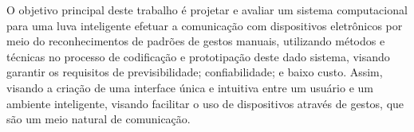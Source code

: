 
O objetivo principal deste trabalho é projetar e avaliar um sistema computacional para uma luva inteligente efetuar a comunicação com dispositivos eletrônicos por meio do reconhecimentos de padrões de gestos manuais, utilizando métodos e técnicas no processo de codificação e prototipação deste dado sistema, visando garantir os requisitos de previsibilidade; confiabilidade; e baixo custo. Assim, visando a criação de uma interface única e intuitiva entre um usuário e um ambiente inteligente, visando facilitar o uso de dispositivos através de gestos, que são um meio natural de comunicação.




